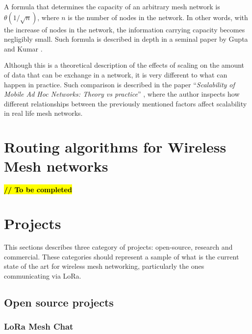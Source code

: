 			A formula that determines the capacity of an arbitrary mesh network is~$\theta(1/\sqrt{n})$, where $ n $ is the number of nodes in the network.
			In other words, with the increase of nodes in the network, the information carrying capacity becomes negligibly small.
			Such formula is described in depth in a seminal paper by Gupta and Kumar \cite{825799}.
			
			Although this is a theoretical description of the effects of scaling on the amount of data that can be exchange in a network, it is very different to what can happen in practice.
			Such comparison is described in the paper ``\textit{Scalability of Mobile Ad Hoc Networks: Theory vs practice}''  \cite{5680385}, where the author inspects how different relationships between the previously mentioned factors affect scalability in real life mesh networks.
	
	\section{Routing algorithms for Wireless Mesh networks}
	
		\textbf{\textcolor{red}{\hl{// To be completed}}}
		
	
	
	\section{Projects}\label{sec:chap4_projects}
		
		This sections describes three category of projects: open-source, research and commercial.
		These categories should represent a sample of what is the current state of the art for wireless mesh networking, particularly the ones communicating via LoRa.
		
		\subsection{Open source projects}
		
			\subsubsection{LoRa Mesh Chat}\label{subsubsec:lorameshchat}

